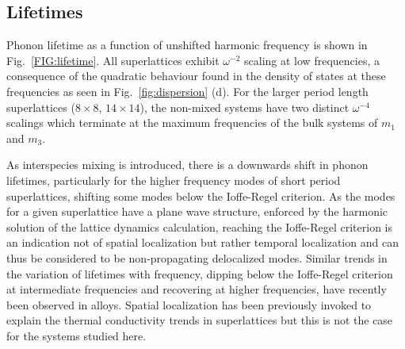 

\subsection{Lifetimes}

Phonon lifetime as a function of unshifted harmonic frequency is shown in Fig.~\ref{FIG:lifetime}. All superlattices exhibit $\omega^{-2}$ scaling at low frequencies, a consequence of the quadratic behaviour found in the density of states at these frequencies as seen in Fig.~\ref{fig:dispersion} (d).\cite{Klemens_Thermal_1951} For the larger period length superlattices ($8\times8$, $14\times14$), the non-mixed systems have two distinct $\omega^{-4}$ scalings which terminate at the maximum frequencies of the bulk systems of $m_1$ and $m_3$.

As interspecies mixing is introduced, there is a downwards shift in phonon lifetimes, particularly for the higher frequency modes of short period superlattices, shifting some modes below the Ioffe-Regel criterion. As the modes for a given superlattice have a plane wave structure, enforced by the harmonic solution of the lattice dynamics calculation, reaching the Ioffe-Regel criterion is an indication not of spatial localization but rather temporal localization and can thus be considered to be non-propagating delocalized modes.\cite{allen_thermal_1993} Similar trends in the variation of lifetimes with frequency, dipping below the Ioffe-Regel criterion at intermediate frequencies and recovering at higher frequencies, have recently been observed in alloys.\cite{jason2013vc} Spatial localization has been previously invoked to explain the thermal conductivity trends in superlattices \cite{PhysRevB.61.3091} but this is not the case for the systems studied here.


